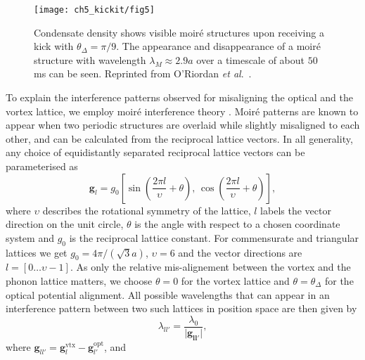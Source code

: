 	\begin{figure}
        \centering
		\texttt{[image: ch5\_kickit/fig5]}
		\caption[Oscillation of moir\'e wavelength.]{Condensate density shows visible moir\'e structures upon receiving a kick with $\theta_\Delta=\pi/9$. The appearance and disappearance of a moir\'e structure with wavelength $\lambda_M \approx 2.9 a$ over a timescale of about $50$ ms can be seen. Reprinted from O'Riordan {\textit{et al}.}~\cite{VTX:oriordan_pra_2016}.}
		\label{fig:dtheta20_ev}
	\end{figure}

    To explain the interference patterns observed for misaligning the optical and the vortex lattice, we employ moir\'e interference theory \cite{SS:Hermann_jpcm_2012}. Moir\'e patterns are known to appear when two periodic structures are overlaid while slightly misaligned to each other, and can be calculated from the reciprocal lattice vectors. In all generality, any choice of equidistantly separated reciprocal lattice vectors can be parameterised as
    	\begin{equation}
    		\mathbf{g}_{l} = g_0 \left[ \sin\left( \frac{2\pi l}{\upsilon}+\theta \right),\, \cos\left( \frac{2\pi l}{\upsilon} +\theta\right) \right],
    	\end{equation}
    where $\upsilon$ describes the rotational symmetry of the lattice, $l$ labels the vector direction on the unit circle, $\theta$ is the angle with respect to a chosen coordinate system and $g_0$ is the reciprocal lattice constant. For commensurate and triangular lattices we get $g_0=4\pi/(\sqrt{3}a)$, $\upsilon=6$ and the vector directions are $l=\left[0\dots\upsilon-1\right]$. As only the relative mis-alignement between the vortex and the phonon lattice matters, we choose $\theta=0$ for the vortex lattice and $\theta=\theta_\Delta$ for the optical potential alignment.
    All possible wavelengths that can appear in an interference pattern between two such lattices in position space are then given by
    	\begin{equation}
    		\lambda_{ll'} = \frac{\lambda_0}{|\mathbf{\mathbf{g}_{ll'}|}},
    		\label{eq:InterferenceVectors}
    	\end{equation}
    where
    $\mathbf{g}_{ll'}=\mathbf{g}_{l}^{\text{vtx}}-\mathbf{g}_{l'}^{\text{opt}}$, and
